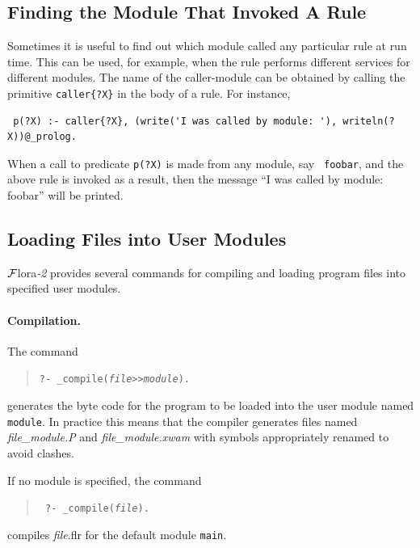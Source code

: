 \documentclass[11pt]{article}
\newcommand{\FLORA}{{\mbox{\sc ${\cal F}${lora}\rm\emph{-2}}}\xspace}
\newcommand{\ofile}{xwam}
\begin{document}
\subsection{Finding the Module That Invoked A Rule}

Sometimes it is useful to find out which module called any particular rule
at run time. This can be used, for example, when the rule performs
different services for different modules. The name of the caller-module can
be obtained by calling the primitive {\tt caller\{?X\}}  in the body of a rule.
For instance, 
\begin{verbatim}
 p(?X) :- caller{?X}, (write('I was called by module: '), writeln(?X))@_prolog.  
\end{verbatim}

When a call to predicate {\tt p(?X)} is made from any module, say {\tt
  foobar}, and the above rule is invoked as a result, then the message ``I
  was called by module: foobar'' will be printed. 


\subsection{Loading Files into User Modules}\label{sec-loading-mods}


\FLORA provides several commands for compiling and loading program files into
specified user modules.

\paragraph{Compilation.}
The command 
\begin{quote}
  {\tt ?- \_compile({\it file}>>{\it module}).}
\end{quote}
generates the byte code for the program to be loaded into the user module
named {\tt module}. In
practice this means that the compiler generates files named
\emph{file\_module.P} and \emph{file\_module.\ofile} with symbols appropriately
renamed to avoid clashes.

If no module is specified, the command
\begin{quote}
 \tt
 ?- \_compile({\it file}).
\end{quote}
compiles {\it file}.flr for the default module {\tt main}.
\end{document}
